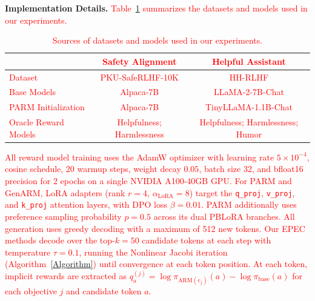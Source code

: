 \documentclass{article}
\begin{document}
\textbf{Implementation Details.}
\textcolor{red}{Table~\ref{tab:sources} summarizes the datasets and models used in our experiments.}

\begin{table}[t]
\centering
\caption{\textcolor{red}{Sources of datasets and models used in our experiments.}}
\vspace{3pt}
\small
\textcolor{red}{
\begin{tabular}{lcc}
\toprule
 & \textbf{Safety Alignment} & \textbf{Helpful Assistant} \\
\midrule
Dataset & PKU-SafeRLHF-10K \citep{ji2023beavertails} & HH-RLHF \citep{bai2022training} \\
Base Models & Alpaca-7B & LLaMA-2-7B-Chat \\
PARM Initialization & Alpaca-7B & TinyLLaMA-1.1B-Chat \\
Oracle Reward Models & Helpfulness; Harmlessness & Helpfulness; Harmlessness; Humor \\
\bottomrule
\end{tabular}
}
\label{tab:sources}
\vspace{-5pt}
\end{table}

\textcolor{red}{All reward model training uses the AdamW optimizer with learning rate $5 \times 10^{-4}$, cosine schedule, 20 warmup steps, weight decay $0.05$, batch size 32, and bfloat16 precision for 2 epochs on a single NVIDIA A100-40GB GPU. For PARM and GenARM, LoRA adapters (rank $r{=}4$, $\alpha_{\mathrm{LoRA}}{=}8$) target the \texttt{q\_proj}, \texttt{v\_proj}, and \texttt{k\_proj} attention layers, with DPO loss $\beta{=}0.01$. PARM additionally uses preference sampling probability $p{=}0.5$ across its dual PBLoRA branches. All generation uses greedy decoding with a maximum of 512 new tokens. Our EPEC methods decode over the top-$k{=}50$ candidate tokens at each step with temperature $\tau{=}0.1$, running the Nonlinear Jacobi iteration (Algorithm~\ref{Algorithm}) until convergence at each token position. At each token, implicit rewards are extracted as $q^{(j)}_a = \log \pi_{\mathrm{ARM}(e_j)}(a) - \log \pi_{\mathrm{base}}(a)$ for each objective $j$ and candidate token $a$.}
\end{document}
